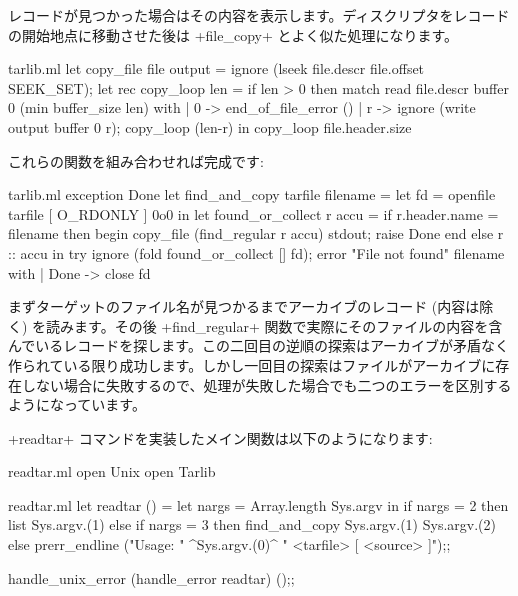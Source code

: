 レコードが見つかった場合はその内容を表示します。ディスクリプタをレコードの開始地点に移動させた後は \ml+file_copy+ とよく似た処理になります。
\begin{listingcodefile}{tarlib.ml}
let copy_file file output =
  ignore (lseek file.descr file.offset SEEK_SET);
  let rec copy_loop len =
    if len > 0 then
      match read file.descr buffer 0 (min buffer_size len) with
      | 0 -> end_of_file_error ()
      | r -> ignore (write output buffer 0 r); copy_loop (len-r) in
  copy_loop file.header.size
\end{listingcodefile}
これらの関数を組み合わせれば完成です:
\begin{listingcodefile}{tarlib.ml}
exception Done
let find_and_copy tarfile filename =
  let fd = openfile tarfile [ O_RDONLY ] 0o0 in
  let found_or_collect r accu =
    if r.header.name = filename then begin
      copy_file (find_regular r accu) stdout;
      raise Done
    end else r :: accu in
  try
     ignore (fold found_or_collect [] fd);
     error "File not found" filename
  with
  | Done -> close fd
\end{listingcodefile}
まずターゲットのファイル名が見つかるまでアーカイブのレコード (内容は除く) を読みます。その後 \ml+find_regular+ 関数で実際にそのファイルの内容を含んでいるレコードを探します。この二回目の逆順の探索はアーカイブが矛盾なく作られている限り成功します。しかし一回目の探索はファイルがアーカイブに存在しない場合に失敗するので、処理が失敗した場合でも二つのエラーを区別するようになっています。

\ml+readtar+ コマンドを実装したメイン関数は以下のようになります:
\begin{codefile}{readtar.ml}
open Unix
open Tarlib
\end{codefile}
\begin{listingcodefile}{readtar.ml}
let readtar () =
  let nargs = Array.length Sys.argv in
  if nargs = 2 then list Sys.argv.(1)
  else if nargs = 3 then find_and_copy Sys.argv.(1) Sys.argv.(2)
  else
    prerr_endline ("Usage: " ^Sys.argv.(0)^ " <tarfile> [ <source> ]");;

handle_unix_error (handle_error readtar) ();;
\end{listingcodefile}

